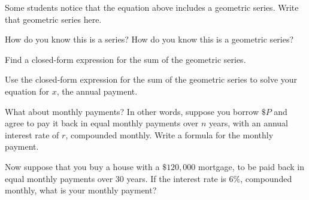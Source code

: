 \documentclass{ximera}
\begin{document}
\begin{question}
Some students notice that the equation above includes a geometric series.  Write that geometric series here.
\begin{freeResponse}
\end{freeResponse}
\end{question}

\begin{question}
How do you know this is a series?  How do you know this is a geometric series?   
\begin{freeResponse}
\end{freeResponse}
\end{question}

\begin{question}
Find a closed-form expression for the sum of the geometric series.  
\begin{freeResponse}
\end{freeResponse}
\end{question}



\begin{question}
Use the closed-form expression for the sum of the geometric series to solve your equation for $x$, the annual payment.   
\begin{freeResponse}
\end{freeResponse}
\end{question}

\begin{question}
What about monthly payments?  In other words, suppose you borrow $\$P$ and agree to pay it back in equal monthly
payments over $n$ years, with an annual interest rate of $r$, compounded monthly.  
Write a formula for the monthly payment.  
\begin{freeResponse}
\end{freeResponse}
\end{question}


\begin{question}
Now suppose that you buy a house with a $\$120,000$ mortgage, to be
paid back in equal monthly payments over $30$ years.  If the interest
rate is $6\%$, compounded monthly, what is your monthly payment?
\begin{freeResponse}
\end{freeResponse}
\end{question}
\end{document}
